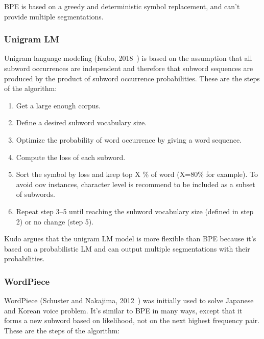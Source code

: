 BPE is based on a greedy and deterministic symbol replacement, and can't provide multiple segmentations.

\subsubsection{Unigram LM}\label{subsubsec:unigramlm}

Unigram language modeling (Kubo, 2018~\cite{kudo-2018-subword}) is based on the assumption that all subword occurrences are independent and therefore that subword sequences are produced by the product of subword occurrence probabilities. These are the steps of the algorithm:

\begin{enumerate}
    \item Get a large enough corpus.
    \item Define a desired subword vocabulary size.
    \item Optimize the probability of word occurrence by giving a word sequence.
    \item Compute the loss of each subword.
    \item Sort the symbol by loss and keep top X \% of word (X=80\% for example). To avoid oov instances, character level is recommend to be included as a subset of subwords.
    \item Repeat step 3–5 until reaching the subword vocabulary size (defined in step 2) or no change (step 5).
\end{enumerate}

Kudo argues that the unigram LM model is more flexible than BPE because it's based on a probabilistic LM and can output multiple segmentations with their probabilities.

\subsubsection{WordPiece}\label{subsubsec:wordpiece}

WordPiece (Schuster and Nakajima, 2012~\cite{schuster2012japanese}) was initially used to solve Japanese and Korean voice problem. It's similar to BPE in many ways, except that it forms a new subword based on likelihood, not on the next highest frequency pair. These are the steps of the algorithm:

